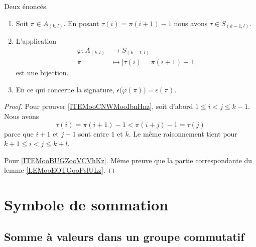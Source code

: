 \begin{lemma}		\label{LEMooCKJAooBIAyVs}
	Deux énoncés.
	\begin{enumerate}
		\item		\label{ITEMooCNWMooIbnHnz}
		      Soit \( \pi\in A_{(k,l)}\). En posant \( \tau(i)=\pi(i+1)-1\) nous avons \( \tau\in S_{(k-1,l)}\).
		\item		\label{ITEMooKNKRooWbLYrF}
		      L'application
		      \begin{equation}
			      \begin{aligned}
				      \varphi\colon A_{(k,l)} & \to S_{(k-1,l)}                          \\
				      \pi                     & \mapsto \Big[  \tau(i)=\pi(i+1)-1  \Big]
			      \end{aligned}
		      \end{equation}
		      est une bijection.
		\item
		      En ce qui concerne la signature, \( \epsilon\big( \varphi(\pi) \big)=\epsilon(\pi)\).
	\end{enumerate}
\end{lemma}

\begin{proof}
	Pour prouver \ref{ITEMooCNWMooIbnHnz}, soit d'abord \( 1\leq i<j\leq k-1\). Nous avons
	\begin{equation}
		\tau(i)=\pi(i+1)-1<\pi(i+j)-1=\tau(j)
	\end{equation}
	parce que \( i+1\) et \( j+1\) sont entre \( 1\) et \( k\). Le même raisonnement tient pour \( k+1\leq i<j\leq k+l\).

	Pour \ref{ITEMooBUGZooVCVhKz}. Même preuve que la partie correspondante du lemme \ref{LEMooEOTGooPslULz}.
\end{proof}




\section{Symbole de sommation}

\subsection{Somme à valeurs dans un groupe commutatif}

